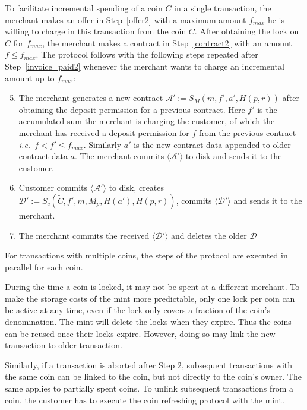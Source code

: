 \documentclass{llncs}
\begin{document}
To facilitate incremental spending of a coin $C$ in a single transaction, the
merchant makes an offer in Step~\ref{offer2} with a maximum amount $f_{max}$ he
is willing to charge in this transaction from the coin $C$.  After obtaining the
lock on $C$ for $f_{max}$, the merchant makes a contract in Step~\ref{contract2}
with an amount $f \leq f_{max}$.  The protocol follows with the following steps
repeated after Step~\ref{invoice_paid2} whenever the merchant wants to charge an
incremental amount up to $f_{max}$:

\begin{enumerate}
  \setcounter{enumi}{4}
\item The merchant generates a new contract $ \mathcal{A}' := S_M(m, f', a', H(p,
  r)) $ after obtaining the deposit-permission for a previous contract.  Here
  $f'$ is the accumulated sum the merchant is charging the customer, of which
  the merchant has received a deposit-permission for $f$ from the previous
  contract \textit{i.e.}~$f <f' \leq f_{max}$.  Similarly $a'$ is the new
  contract data appended to older contract data $a$.
  The merchant commits $\langle \mathcal{A}' \rangle$ to disk and sends it to the customer.
\item Customer commits $\langle \mathcal{A}' \rangle$ to disk, creates
  $\mathcal{D}' := S_c(\widetilde{C}, f', m, M_p, H(a'), H(p, r))$, commits
  $\langle \mathcal{D'} \rangle$ and sends it to the merchant.
\item The merchant commits the received $\langle \mathcal{D'} \rangle$ and
  deletes the older $\mathcal{D}$
\end{enumerate}


For transactions with multiple coins, the steps of the protocol are executed in
parallel for each coin.

During the time a coin is locked, it may not be spent at a
different merchant.  To make the storage costs of the mint more predictable,
only one lock per coin can be active at any time, even if the lock only covers a
fraction of the coin's denomination.  The mint will delete the locks when they
expire.  Thus the coins can be reused once their locks expire.  However, doing
so may link the new transaction to older transaction.

Similarly, if a transaction is aborted after Step 2, subsequent transactions
with the same coin can be linked to the coin, but not directly to the coin's
owner.  The same applies to partially spent coins.  To unlink subsequent
transactions from a coin, the customer has to execute the coin refreshing
protocol with the mint.
\end{document}
